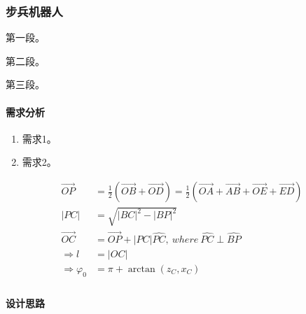 
\subsubsection{步兵机器人}

    第一段。\par
    
    第二段。\par
    
    第三段。\par

    \paragraph{需求分析}
    
        \begin{enumerate}
            \item 需求1。
        
            \item 需求2。
        \end{enumerate}
    
        \begin{align*}
            \Vec{OP} &= \frac{1}{2} ( \Vec{OB} + \Vec{OD} ) = \frac{1}{2} ( \Vec{OA} + \Vec{AB} + \Vec{OE} + \Vec{ED} ) \\
            |PC| &= \sqrt{|BC|^2 - |BP|^2} \\
            \Vec{OC} &= \Vec{OP} + |PC|\hat{PC} , ~{where}~ \hat{PC} \perp \hat{BP} \\
            \Rightarrow l &= |OC| \\
            \Rightarrow \varphi_0 &= \pi + \arctan(z_C, x_C) \\
        \end{align*}
    
    \paragraph{设计思路}
        

